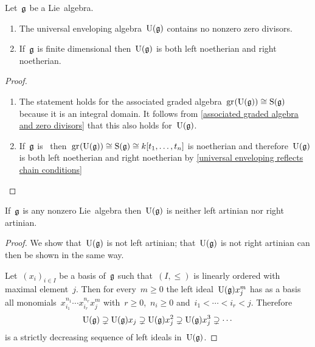 \begin{corollary}
  \label{uea contains no zero divisors}
  Let~$\mathfrak{g}$ be a Lie~algebra.
  \begin{enumerate}
    \item
      The universal enveloping algebra~$\operatorname{U}(\mathfrak{g})$ contains no nonzero zero divisors.
    \item
      If~$\mathfrak{g}$ is finite dimensional then~$\operatorname{U}(\mathfrak{g})$ is both left noetherian and right noetherian.
  \end{enumerate}
\end{corollary}


\begin{proof}
  \leavevmode
  \begin{enumerate}
    \item
      The statement holds for the associated graded algebra~$\gr(\Univ(\glie)) \cong \Symm(\glie)$ because it is an integral domain.
      It follows from \cref{associated graded algebra and zero divisors} that this also holds for~$\operatorname{U}(\mathfrak{g})$.
    \item
      If~$\mathfrak{g}$ is~{} then~$\gr(\Univ(\glie)) \cong \Symm(\glie) \cong k[t_1, \dotsc, t_n]$ is noetherian and therefore~$\operatorname{U}(\mathfrak{g})$ is both left noetherian and right noetherian by \cref{universal enveloping reflects chain conditions}
    \qedhere
  \end{enumerate}
\end{proof}


\begin{lemma}
  If~$\mathfrak{g}$ is any nonzero Lie~algebra then~$\operatorname{U}(\mathfrak{g})$ is neither left artinian nor right artinian.
\end{lemma}


\begin{proof}
  We show that~$\operatorname{U}(\mathfrak{g})$ is not left artinian;
  that~$\operatorname{U}(\mathfrak{g})$ is not right artinian can then be shown in the same way.
  
  Let~$(x_i)_{i \in I}$ be a basis of~$\mathfrak{g}$ such that~$(I, \leq)$ is linearly ordered with maximal element~$j$.
  Then for every~$m \geq 0$ the left ideal~$\operatorname{U}(\mathfrak{g}) x_j^m$ has as a basis all monomials~$x_{i_1}^{n_1} \dotsm x_{i_r}^{n_r} x_j^m$ with~$r \geq 0$,~$n_i \geq 0$ and~$i_1 < \dotsb < i_r < j$.
  Therefore
  \[
    \operatorname{U}(\mathfrak{g})
    \supsetneq
    \operatorname{U}(\mathfrak{g}) x_j
    \supsetneq
    \operatorname{U}(\mathfrak{g}) x_j^2
    \supsetneq
    \operatorname{U}(\mathfrak{g}) x_j^3
    \supsetneq
    \dotsb
  \]
  is a strictly decreasing sequence of left ideals in~$\operatorname{U}(\mathfrak{g})$.
\end{proof}


